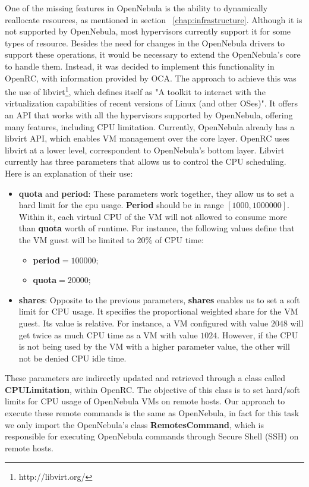 \documentclass[jidm,a4paper]{jidm} %
\begin{document}
One of the missing features in OpenNebula is the ability to dynamically reallocate resources, as mentioned in section ~\ref{chap:infrastructure}. Although it is not supported by OpenNebula, most hypervisors currently support it for some types of resource. Besides the need for changes in the OpenNebula drivers to support these operations, it would be necessary to extend the OpenNebula's core to handle them. Instead, it was decided to implement this functionality in OpenRC, with information provided by OCA. The approach to achieve this  was the use of libvirt\footnote{http://libvirt.org/}, which defines itself as "A toolkit to interact with the virtualization capabilities of recent versions of Linux (and other OSes)". It offers an API that works with all the hypervisors supported by OpenNebula, offering many features, including CPU limitation. Currently, OpenNebula already has a libvirt API, which enables VM management over the core layer. OpenRC uses libvirt at a lower level, correspondent to OpenNebula's 
bottom layer. Libvirt currently has three parameters that allows us to control the CPU scheduling. Here is an explanation of their use:
\begin{itemize}
 \item \textbf{quota} and \textbf{period}: These parameters work together, they allow us to set a hard limit for the cpu usage. \textbf{Period} should be in range $[1000, 1000000]$. Within it, each virtual CPU of the VM will not allowed to consume more than \textbf{quota} worth of runtime. For instance, the following values define that the VM guest will be limited to $20\%$ of CPU time:
  \begin{itemize}
   \item  \textbf{period}$=100000$; 
   \item \textbf{quota}$=20000$;
  \end{itemize}
  \item \textbf{shares}: Opposite to the previous parameters, \textbf{shares} enables us to set a soft limit for CPU usage. It specifies the proportional weighted share for the VM guest. Its value is relative. For instance, a VM configured with value $2048$ will get twice as much CPU time as a VM with value $1024$. However, if the CPU is not being used by the VM with a higher parameter value, the other will not be denied CPU idle time.
\end{itemize}

These parameters are indirectly updated and retrieved through a class called \textbf{CPULimitation}, within OpenRC. The objective of this class is to set hard/soft limits for CPU usage of OpenNebula VMs on remote hosts. Our approach to execute these remote commands  is the same as OpenNebula, in fact for this task we only import the OpenNebula's class \textbf{RemotesCommand}, which is responsible for executing OpenNebula commands through Secure Shell (SSH) on remote hosts.
\end{document}
